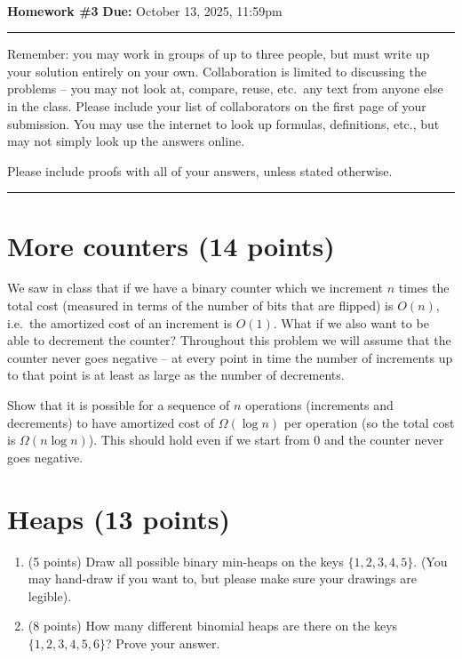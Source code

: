\documentclass[11pt]{article}
\begin{document}
\\
{{\bf Homework \#3}} \hfill {{\bf Due:} October 13, 2025, 11:59pm} \\
\rule[0.1in]{\textwidth}{0.4pt}

Remember: you may work in groups of up to three people, but must write up your solution entirely on your own.  Collaboration is limited to discussing the problems -- you may not look at, compare, reuse, etc.~any text from anyone else in the class.  Please include your list of collaborators on the first page of your submission.  You may use the internet to look up formulas, definitions, etc., but may not simply look up the answers online.  

Please include proofs with all of your answers, unless stated otherwise.

\noindent \rule[0.1in]{\textwidth}{0.4pt}

\section{More counters (14 points)}
We saw in class that if we have a binary counter which we increment $n$ times the total cost (measured in terms of the number of bits that are flipped) is $O(n)$, i.e.~the amortized cost of an increment is $O(1)$.  What if we also want to be able to decrement the counter?  Throughout this problem we will assume that the counter never goes negative -- at every point in time the number of increments up to that point is at least as large as the number of decrements.

 Show that it is possible for a sequence of $n$ operations (increments and decrements) to have amortized cost of $\Omega(\log n)$ per operation (so the total cost is $\Omega(n \log n)$).  This should hold even if we start from $0$ and the counter never goes negative.




\section{Heaps (13 points)}
\begin{enumerate}
\item (5 points) Draw all possible binary min-heaps on the keys $\{1,2,3,4,5\}$.  (You may hand-draw if you want to, but please make sure your drawings are legible).

\item (8 points) How many different binomial heaps are there on the keys $\{1,2,3,4,5,6\}$?  Prove your answer.  

\end{enumerate}
\end{document}
